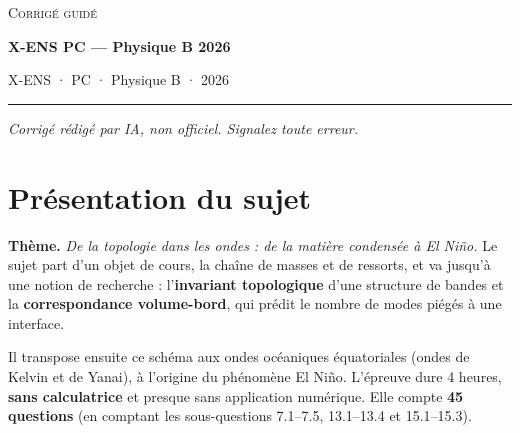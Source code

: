 \documentclass[11pt,a4paper]{article}
\begin{document}
\thispagestyle{plain}
\begin{center}
  {\small\scshape Corrigé guidé}\par\smallskip
  {\LARGE\bfseries X-ENS PC — Physique B 2026\par}\medskip
  {\large X-ENS · PC · Physique B · 2026\par}
\end{center}
\vspace{2pt}\hrule\vspace{8pt}

\emph{Corrigé rédigé par IA, non officiel. Signalez toute erreur.}

\hypertarget{pruxe9sentation-du-sujet}{%
\section{Présentation du sujet}\label{pruxe9sentation-du-sujet}}

\textbf{Thème.} \emph{De la topologie dans les ondes : de la matière condensée à El Niño.} Le sujet part d'un objet de cours, la chaîne de masses et de ressorts, et va jusqu'à une notion de recherche : l'\textbf{invariant topologique} d'une structure de bandes et la \textbf{correspondance volume-bord}, qui prédit le nombre de modes piégés à une interface.

Il transpose ensuite ce schéma aux ondes océaniques équatoriales (ondes de Kelvin et de Yanai), à l'origine du phénomène El Niño. L'épreuve dure 4 heures, \textbf{sans calculatrice} et presque sans application numérique. Elle compte \textbf{45 questions} (en comptant les sous-questions 7.1--7.5, 13.1--13.4 et 15.1--15.3).
\end{document}
